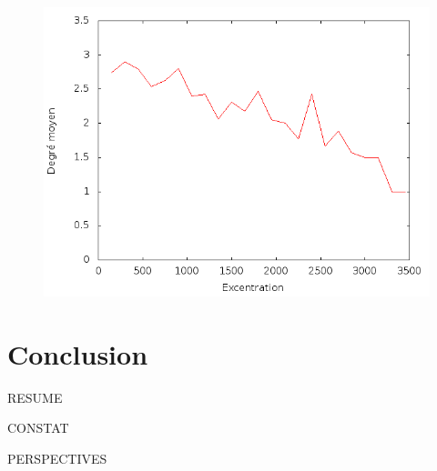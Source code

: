 \documentclass[12pt]{article}
\begin{document}
\begin{figure}[H]
  \centering
  \includegraphics[width=.8\linewidth]{images/degree_distance.png}
  \caption{}
\end{figure}

\section{Conclusion}

RESUME

CONSTAT

PERSPECTIVES

\printbibliography
\end{document}
